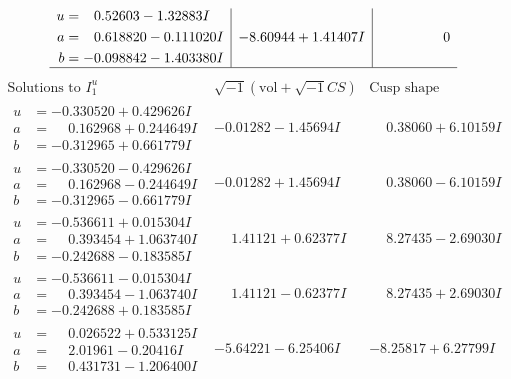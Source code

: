 \documentclass[1p]{elsarticle_modified}
\theoremstyle{definition}
\newcommand{\I}{\sqrt{-1}}
\begin{document}
$$\begin{array}{c|c|c}
\begin{aligned}
u &= \phantom{-}0.52603 - 1.32883 I \\
a &= \phantom{-}0.618820 - 0.111020 I \\
b &= -0.098842 - 1.403380 I\end{aligned}
 & -8.60944 + 1.41407 I & \phantom{-0.000000 } 0\\
 \hline 
 \end{array}$$\newpage$$\begin{array}{c|c|c}  
\text{Solutions to }I^u_{1}& \I (\text{vol} + \sqrt{-1}CS) & \text{Cusp shape}\\
 \hline 
\begin{aligned}
u &= -0.330520 + 0.429626 I \\
a &= \phantom{-}0.162968 + 0.244649 I \\
b &= -0.312965 + 0.661779 I\end{aligned}
 & -0.01282 - 1.45694 I & \phantom{-}0.38060 + 6.10159 I \\ \hline\begin{aligned}
u &= -0.330520 - 0.429626 I \\
a &= \phantom{-}0.162968 - 0.244649 I \\
b &= -0.312965 - 0.661779 I\end{aligned}
 & -0.01282 + 1.45694 I & \phantom{-}0.38060 - 6.10159 I \\ \hline\begin{aligned}
u &= -0.536611 + 0.015304 I \\
a &= \phantom{-}0.393454 + 1.063740 I \\
b &= -0.242688 - 0.183585 I\end{aligned}
 & \phantom{-}1.41121 + 0.62377 I & \phantom{-}8.27435 - 2.69030 I \\ \hline\begin{aligned}
u &= -0.536611 - 0.015304 I \\
a &= \phantom{-}0.393454 - 1.063740 I \\
b &= -0.242688 + 0.183585 I\end{aligned}
 & \phantom{-}1.41121 - 0.62377 I & \phantom{-}8.27435 + 2.69030 I \\ \hline\begin{aligned}
u &= \phantom{-}0.026522 + 0.533125 I \\
a &= \phantom{-}2.01961 - 0.20416 I \\
b &= \phantom{-}0.431731 - 1.206400 I\end{aligned}
 & -5.64221 - 6.25406 I & -8.25817 + 6.27799 I \\ \hline\begin{aligned}

\end{aligned}
\end{array}$$
\end{document}
